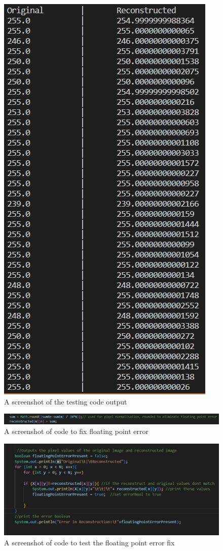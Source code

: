     \begin{figure}[H]
        \centering
        \includegraphics[width=0.49\columnwidth]{Figures/Week 1/W1-SimpleFT-InverseDFT-Test-1.0-Output.png}
        \caption{A screenshot of the testing code output}
        \label{fig:Testing-Code-output}
    \end{figure}
    
    \begin{figure}[H]
        \centering
        \includegraphics[width=0.49\columnwidth]{Figures/Week 1/W1-SimpleFT-InverseDFT-Floating-Point-Fix.png}
        \caption{A screenshot of code to fix floating point error}
        \label{fig:floating-Point-Fix}
    \end{figure}


    \begin{figure}[H]
        \centering
        \includegraphics[width=0.49\columnwidth]{Figures/Week 1/W1-SimpleFT-InverseDFT-Test-2.0-code.png}
        \caption{A screenshot of code to test the floating point error fix}
        \label{fig:floating-Point-Fixed-test}
    \end{figure}

